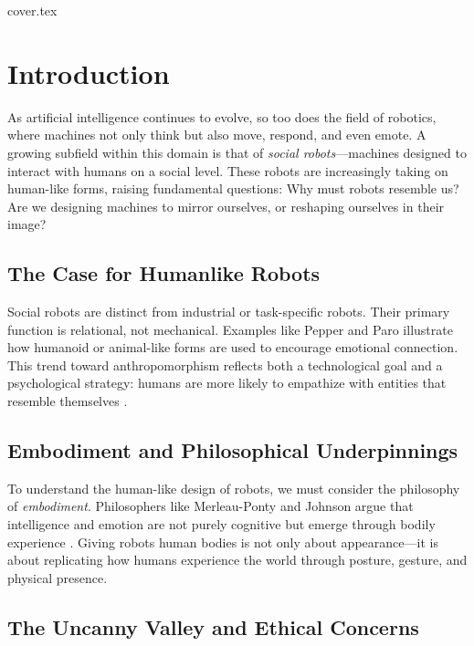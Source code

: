 \documentclass{article}
\begin{document}
\newpage
\clearpage
{cover.tex}
\tableofcontents

\newpage
\section{Introduction}

As artificial intelligence continues to evolve, so too does the field of robotics, where machines not only think but also move, respond, and even emote. A growing subfield within this domain is that of \textit{social robots}---machines designed to interact with humans on a social level. These robots are increasingly taking on human-like forms, raising fundamental questions: Why must robots resemble us? Are we designing machines to mirror ourselves, or reshaping ourselves in their image?

\subsection{The Case for Humanlike Robots}

Social robots are distinct from industrial or task-specific robots. Their primary function is relational, not mechanical. Examples like Pepper \citep{pepperSoftbank} and Paro \citep{paro2003} illustrate how humanoid or animal-like forms are used to encourage emotional connection. This trend toward anthropomorphism reflects both a technological goal and a psychological strategy: humans are more likely to empathize with entities that resemble themselves \citep{dautenhahn2007}.

\subsection{Embodiment and Philosophical Underpinnings}

To understand the human-like design of robots, we must consider the philosophy of \textit{embodiment}. Philosophers like Merleau-Ponty and Johnson argue that intelligence and emotion are not purely cognitive but emerge through bodily experience \citep{merleau1962, johnson2007}.
Giving robots human bodies is not only about appearance—it is about replicating how humans experience the world through posture, gesture, and physical presence.

\subsection{The Uncanny Valley and Ethical Concerns}
\end{document}
